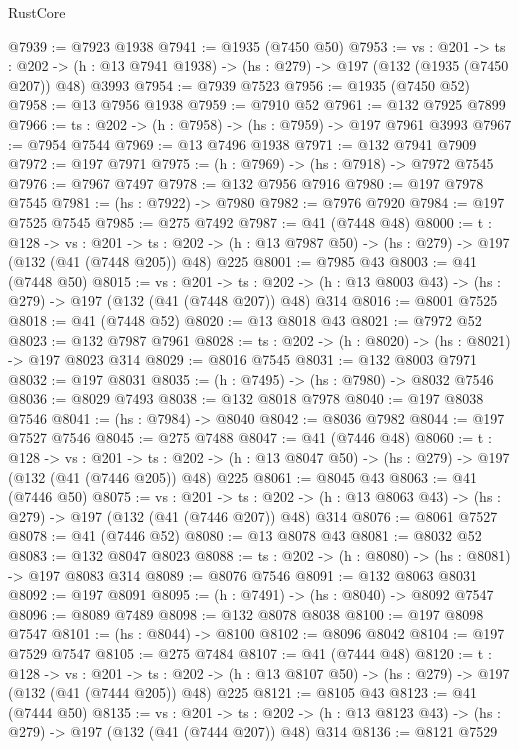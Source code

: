 \begin{lexlean}{RustCore}
\begin{coremodule}
@7939 := @7923 @1938
@7941 := @1935 (@7450 @50)
@7953 := {vs : @201} ->
  {ts : @202} -> (h : @13 @7941 @1938) -> (hs : @279) -> @197 (@132 (@1935 (@7450 @207)) @48) @3993
@7954 := @7939 @7523
@7956 := @1935 (@7450 @52)
@7958 := @13 @7956 @1938
@7959 := @7910 @52
@7961 := @132 @7925 @7899
@7966 := {ts : @202} -> (h : @7958) -> (hs : @7959) -> @197 @7961 @3993
@7967 := @7954 @7544
@7969 := @13 @7496 @1938
@7971 := @132 @7941 @7909
@7972 := @197 @7971
@7975 := (h : @7969) -> (hs : @7918) -> @7972 @7545
@7976 := @7967 @7497
@7978 := @132 @7956 @7916
@7980 := @197 @7978 @7545
@7981 := (hs : @7922) -> @7980
@7982 := @7976 @7920
@7984 := @197 @7525 @7545
@7985 := @275 @7492
@7987 := @41 (@7448 @48)
@8000 := {t : @128} ->
  {vs : @201} ->
  {ts : @202} -> (h : @13 @7987 @50) -> (hs : @279) -> @197 (@132 (@41 (@7448 @205)) @48) @225
@8001 := @7985 @43
@8003 := @41 (@7448 @50)
@8015 := {vs : @201} ->
  {ts : @202} -> (h : @13 @8003 @43) -> (hs : @279) -> @197 (@132 (@41 (@7448 @207)) @48) @314
@8016 := @8001 @7525
@8018 := @41 (@7448 @52)
@8020 := @13 @8018 @43
@8021 := @7972 @52
@8023 := @132 @7987 @7961
@8028 := {ts : @202} -> (h : @8020) -> (hs : @8021) -> @197 @8023 @314
@8029 := @8016 @7545
@8031 := @132 @8003 @7971
@8032 := @197 @8031
@8035 := (h : @7495) -> (hs : @7980) -> @8032 @7546
@8036 := @8029 @7493
@8038 := @132 @8018 @7978
@8040 := @197 @8038 @7546
@8041 := (hs : @7984) -> @8040
@8042 := @8036 @7982
@8044 := @197 @7527 @7546
@8045 := @275 @7488
@8047 := @41 (@7446 @48)
@8060 := {t : @128} ->
  {vs : @201} ->
  {ts : @202} -> (h : @13 @8047 @50) -> (hs : @279) -> @197 (@132 (@41 (@7446 @205)) @48) @225
@8061 := @8045 @43
@8063 := @41 (@7446 @50)
@8075 := {vs : @201} ->
  {ts : @202} -> (h : @13 @8063 @43) -> (hs : @279) -> @197 (@132 (@41 (@7446 @207)) @48) @314
@8076 := @8061 @7527
@8078 := @41 (@7446 @52)
@8080 := @13 @8078 @43
@8081 := @8032 @52
@8083 := @132 @8047 @8023
@8088 := {ts : @202} -> (h : @8080) -> (hs : @8081) -> @197 @8083 @314
@8089 := @8076 @7546
@8091 := @132 @8063 @8031
@8092 := @197 @8091
@8095 := (h : @7491) -> (hs : @8040) -> @8092 @7547
@8096 := @8089 @7489
@8098 := @132 @8078 @8038
@8100 := @197 @8098 @7547
@8101 := (hs : @8044) -> @8100
@8102 := @8096 @8042
@8104 := @197 @7529 @7547
@8105 := @275 @7484
@8107 := @41 (@7444 @48)
@8120 := {t : @128} ->
  {vs : @201} ->
  {ts : @202} -> (h : @13 @8107 @50) -> (hs : @279) -> @197 (@132 (@41 (@7444 @205)) @48) @225
@8121 := @8105 @43
@8123 := @41 (@7444 @50)
@8135 := {vs : @201} ->
  {ts : @202} -> (h : @13 @8123 @43) -> (hs : @279) -> @197 (@132 (@41 (@7444 @207)) @48) @314
@8136 := @8121 @7529

\end{coremodule}
\end{lexlean}
